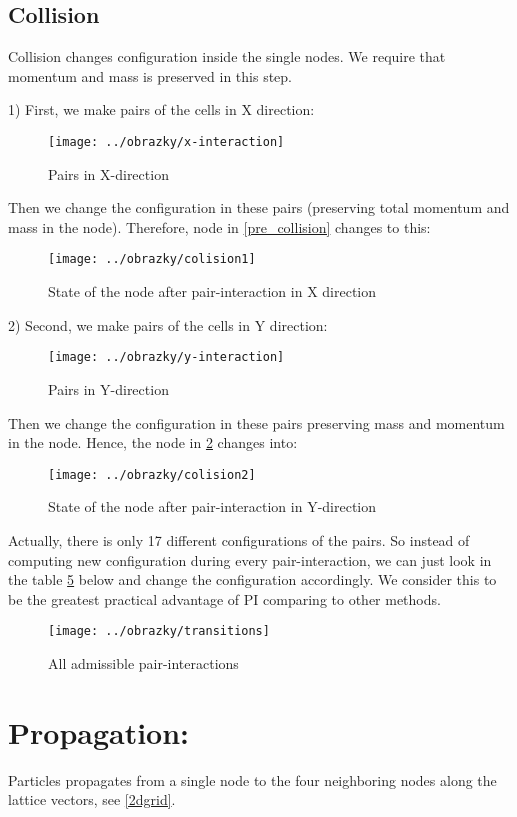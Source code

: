 \subsection{Collision}
Collision changes configuration inside the single nodes. We require that momentum and mass is preserved in this step.

1) First, we make pairs of the cells in X direction:
\begin{figure}[htbp]
 \centering 
 \texttt{[image: ../obrazky/x-interaction]}
 \label{xinter}
 \caption{Pairs in X-direction}
\end{figure}

Then we change the configuration in these pairs (preserving total momentum and mass in the node). Therefore, node in \ref{pre_collision} changes to this:

\begin{figure}[htbp]
 \centering 
 \texttt{[image: ../obrazky/colision1]}
 \label{colision1}
 \caption{State of the node after pair-interaction in X direction}
\end{figure}

2) Second, we make pairs of the cells in Y direction:
\begin{figure}[htbp]
 \centering 
 \texttt{[image: ../obrazky/y-interaction]}
 \label{yinter}
 \caption{Pairs in Y-direction}
\end{figure}

 Then we change the configuration in these pairs preserving mass and momentum in the node. Hence, the node in \ref{colision1} changes into:
 \begin{figure}[htbp]
 \centering 
 \texttt{[image: ../obrazky/colision2]}
 \label{colision2}
 \caption{State of the node after pair-interaction in Y-direction}
\end{figure}
\newpage
Actually, there is only 17 different configurations of the pairs. So instead of computing new configuration during every pair-interaction, we can just look in the table \ref{transitions} below and change the configuration accordingly. We consider this to be the greatest practical advantage of PI comparing to other methods.
\newpage
\begin{figure}[htbp]
 \centering 
 \texttt{[image: ../obrazky/transitions]}
 \label{transitions}
 \caption{All admissible pair-interactions}
\end{figure}

\section{Propagation:}
Particles propagates from a single node to the four neighboring nodes along the lattice vectors, see \ref{2dgrid}.

